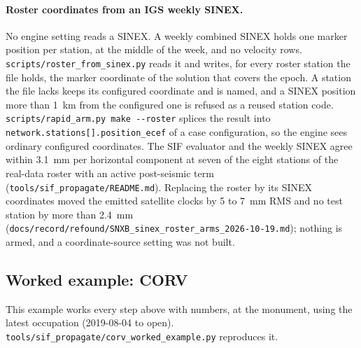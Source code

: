 \documentclass[main.tex]{subfiles}
\begin{document}
\paragraph{Roster coordinates from an IGS weekly SINEX.}
No engine setting reads a SINEX.  A weekly combined SINEX holds one
marker position per station, at the middle of the week, and no velocity
rows.  \texttt{scripts/roster\_from\_sinex.py} reads it and writes, for
every roster station the file holds, the marker coordinate of the
solution that covers the epoch.  A station the file lacks keeps its
configured coordinate and is named, and a SINEX position more than
\SI{1}{\kilo\metre} from the configured one is refused as a reused
station code.  \texttt{scripts/rapid\_arm.py make -{}-roster} splices
the result into \texttt{network.stations[].position\_ecef} of a case
configuration, so the engine sees ordinary configured coordinates.  The
SIF evaluator and the weekly SINEX agree within \SI{3.1}{\milli\metre}
per horizontal component at seven of the eight stations of the real-data roster
with an active post-seismic term
(\texttt{tools/sif\_propagate/README.md}).  Replacing the roster by its
SINEX coordinates moved the emitted satellite clocks by 5 to
\SI{7}{\milli\metre} RMS and no test station by more than
\SI{2.4}{\milli\metre}
(\texttt{docs/record/refound/SNXB\_sinex\_roster\_arms\_2026-10-19.md}); nothing is
armed, and a coordinate-source setting was not built.

\subsection{Worked example: CORV}\label{sec:trf-corv}

This example works every step above with numbers, at the monument,
using the latest occupation (2019-08-04 to open).
\texttt{tools/sif\_propagate/corv\_worked\_example.py} reproduces it.
\end{document}
